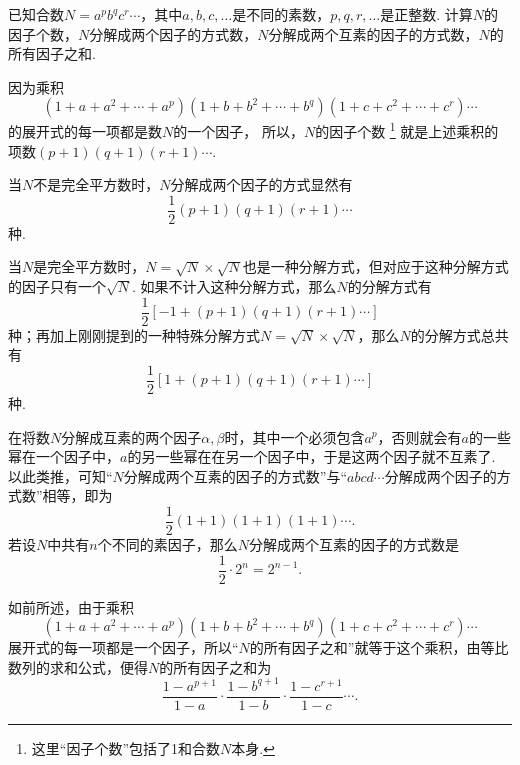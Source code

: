 \begin{example}
已知合数\(N = a^p b^q c^r \dotsm\)，其中\(a,b,c,\dotsc\)是不同的素数，\(p,q,r,\dotsc\)是正整数.
计算\(N\)的因子个数，\(N\)分解成两个因子的方式数，\(N\)分解成两个互素的因子的方式数，\(N\)的所有因子之和.
\begin{solution}
因为乘积\begin{equation*}
(1+a+a^2+\dotsb+a^p)
(1+b+b^2+\dotsb+b^q)
(1+c+c^2+\dotsb+c^r)\dotsm
\end{equation*}的展开式的每一项都是数\(N\)的一个因子，
所以，\(N\)的因子个数%
\footnote{这里“因子个数”包括了1和合数\(N\)本身.}%
就是上述乘积的项数\((p+1)(q+1)(r+1)\dotsm\).

当\(N\)不是完全平方数时，\(N\)分解成两个因子的方式显然有\begin{equation*}
\frac{1}{2} (p+1)(q+1)(r+1)\dotsm
\end{equation*}种.

当\(N\)是完全平方数时，\(N = \sqrt{N}\times\sqrt{N}\)也是一种分解方式，但对应于这种分解方式的因子只有一个\(\sqrt{N}\).
如果不计入这种分解方式，那么\(N\)的分解方式有\begin{equation*}
\frac{1}{2} \left[-1 + (p+1)(q+1)(r+1)\dotsm\right]
\end{equation*}种；再加上刚刚提到的一种特殊分解方式\(N = \sqrt{N}\times\sqrt{N}\)，那么\(N\)的分解方式总共有\begin{equation*}
\frac{1}{2} \left[1 + (p+1)(q+1)(r+1)\dotsm\right]
\end{equation*}种.

在将数\(N\)分解成互素的两个因子\(\alpha,\beta\)时，其中一个必须包含\(a^p\)，否则就会有\(a\)的一些幂在一个因子中，\(a\)的另一些幂在在另一个因子中，于是这两个因子就不互素了.
以此类推，可知“\(N\)分解成两个互素的因子的方式数”与“\(abcd\dotsm\)分解成两个因子的方式数”相等，即为\begin{equation*}
\frac{1}{2}(1+1)(1+1)(1+1)\dotsm.
\end{equation*}若设\(N\)中共有\(n\)个不同的素因子，那么\(N\)分解成两个互素的因子的方式数是\begin{equation*}
\frac{1}{2} \cdot 2^n = 2^{n-1}.
\end{equation*}

如前所述，由于乘积\begin{equation*}
(1+a+a^2+\dotsb+a^p)
(1+b+b^2+\dotsb+b^q)
(1+c+c^2+\dotsb+c^r)\dotsm
\end{equation*}展开式的每一项都是一个因子，所以“\(N\)的所有因子之和”就等于这个乘积，由等比数列的求和公式，便得\(N\)的所有因子之和为\begin{equation*}
\frac{1-a^{p+1}}{1-a}\cdot\frac{1-b^{q+1}}{1-b}\cdot\frac{1-c^{r+1}}{1-c}\dotsm.
\end{equation*}
\end{solution}
\end{example}

